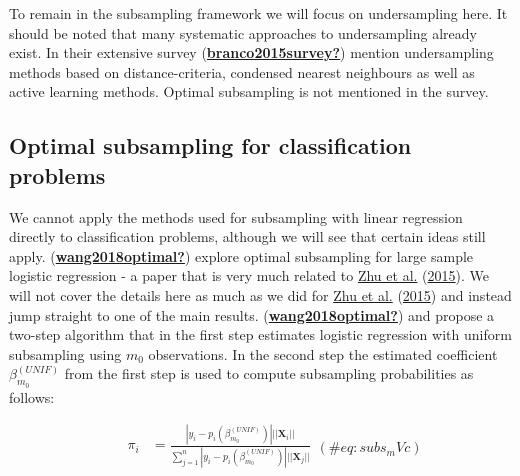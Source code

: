 \documentclass[
]{book}
\begin{document}
To remain in the subsampling framework we will focus on undersampling here. It should be noted that many systematic approaches to undersampling already exist. In their extensive survey (\protect\hyperlink{ref-branco2015survey}{\textbf{branco2015survey?}}) mention undersampling methods based on distance-criteria, condensed nearest neighbours as well as active learning methods. Optimal subsampling is not mentioned in the survey.

\hypertarget{optimal-subsampling-for-classification-problems}{%
\subsection{Optimal subsampling for classification problems}\label{optimal-subsampling-for-classification-problems}}

We cannot apply the methods used for subsampling with linear regression directly to classification problems, although we will see that certain ideas still apply. (\protect\hyperlink{ref-wang2018optimal}{\textbf{wang2018optimal?}}) explore optimal subsampling for large sample logistic regression - a paper that is very much related to \protect\hyperlink{ref-zhu2015optimal}{Zhu et al.} (\protect\hyperlink{ref-zhu2015optimal}{2015}). We will not cover the details here as much as we did for \protect\hyperlink{ref-zhu2015optimal}{Zhu et al.} (\protect\hyperlink{ref-zhu2015optimal}{2015}) and instead jump straight to one of the main results. (\protect\hyperlink{ref-wang2018optimal}{\textbf{wang2018optimal?}}) and propose a two-step algorithm that in the first step estimates logistic regression with uniform subsampling using \(m_0\) observations. In the second step the estimated coefficient \(\beta^{(UNIF)}_{m_0}\) from the first step is used to compute subsampling probabilities as follows:

\[
\begin{equation} 
\begin{aligned}
&& \pi_i&= \frac{|y_i-p_i(\beta^{(UNIF)}_{m_0})|||\mathbf{X}_i||}{\sum_{j=1}^n|y_i-p_i(\beta^{(UNIF)}_{m_0})|||\mathbf{X}_j||}\\
\end{aligned}
(\#eq:subs_mVc)
\end{equation}
\]
\end{document}
